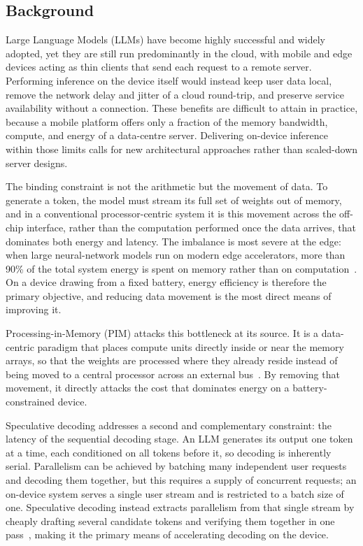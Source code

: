 \documentclass[11pt]{article}
\begin{document}
\subsection{Background}
Large Language Models (LLMs) have become highly successful and widely adopted, yet they are still run predominantly in the cloud, with mobile and edge devices acting as thin clients that send each request to a remote server. Performing inference on the device itself would instead keep user data local, remove the network delay and jitter of a cloud round-trip, and preserve service availability without a connection. These benefits are difficult to attain in practice, because a mobile platform offers only a fraction of the memory bandwidth, compute, and energy of a data-centre server. Delivering on-device inference within those limits calls for new architectural approaches rather than scaled-down server designs.

The binding constraint is not the arithmetic but the movement of data. To generate a token, the model must stream its full set of weights out of memory, and in a conventional processor-centric system it is this movement across the off-chip interface, rather than the computation performed once the data arrives, that dominates both energy and latency. The imbalance is most severe at the edge: when large neural-network models run on modern edge accelerators, more than 90\% of the total system energy is spent on memory rather than on computation~\cite{mutlu2022primer}. On a device drawing from a fixed battery, energy efficiency is therefore the primary objective, and reducing data movement is the most direct means of improving it.

Processing-in-Memory (PIM) attacks this bottleneck at its source. It is a data-centric paradigm that places compute units directly inside or near the memory arrays, so that the weights are processed where they already reside instead of being moved to a central processor across an external bus~\cite{mutlu2022primer}. By removing that movement, it directly attacks the cost that dominates energy on a battery-constrained device.

Speculative decoding addresses a second and complementary constraint: the latency of the sequential decoding stage. An LLM generates its output one token at a time, each conditioned on all tokens before it, so decoding is inherently serial. Parallelism can be achieved by batching many independent user requests and decoding them together, but this requires a supply of concurrent requests; an on-device system serves a single user stream and is restricted to a batch size of one. Speculative decoding instead extracts parallelism from that single stream by cheaply drafting several candidate tokens and verifying them together in one pass~\cite{leviathan2023speculative}, making it the primary means of accelerating decoding on the device.
\end{document}
